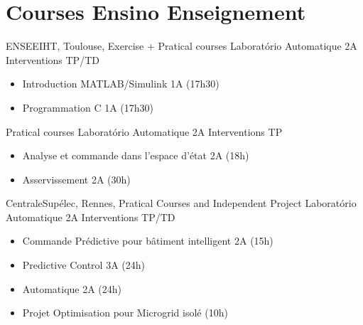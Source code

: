 \section{
  \ml
  {Courses}
  {Ensino}
  {Enseignement}
}

{ENSEEIHT, Toulouse, \france}
{\newline \ml
  {Exercise + Pratical courses}
  {Laboratório Automatique 2A}
  {Interventions TP/TD}
}
{}
{}
{
    \begin{itemize}
    \item Introduction MATLAB/Simulink 1A (17h30)
    \item Programmation C 1A (17h30)
  \end{itemize}
}
{\newline
\ml
  {Pratical courses}
  {Laboratório Automatique 2A}
  {Interventions TP}}
{}
{}
{
  \begin{itemize}
    \item Analyse et commande dans l'espace d'état 2A (18h)
    \item Asservissement 2A (30h)
  \end{itemize}
}

{CentraleSupélec, Rennes, \france}
{\newline \ml
  {Pratical Courses and Independent Project}
  {Laboratório Automatique 2A}
  {Interventions TP/TD}}
{}
{}
{
  \begin{itemize}
    \item Commande Prédictive pour bâtiment intelligent 2A (15h)
    \item Predictive Control 3A (24h)
    \item Automatique 2A (24h)
    \item Projet Optimisation pour Microgrid isolé (10h)
  \end{itemize}
}

